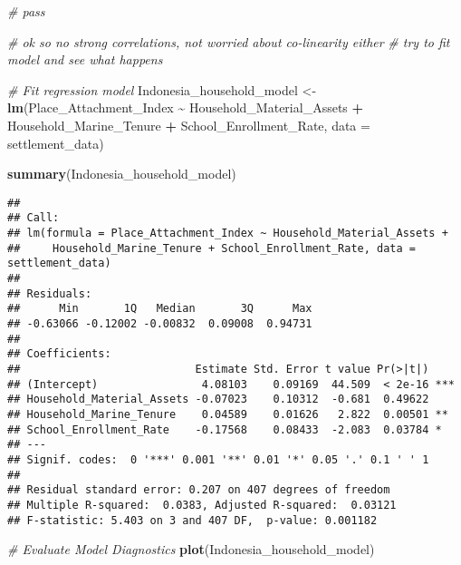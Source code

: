 \documentclass[
]{article}
\newenvironment{Shaded}{\begin{snugshade}}{\end{snugshade}}
\newcommand{\AttributeTok}[1]{\textcolor[rgb]{0.13,0.29,0.53}{#1}}
\newcommand{\CommentTok}[1]{\textcolor[rgb]{0.56,0.35,0.01}{\textit{#1}}}
\newcommand{\FunctionTok}[1]{\textcolor[rgb]{0.13,0.29,0.53}{\textbf{#1}}}
\newcommand{\NormalTok}[1]{#1}
\newcommand{\OtherTok}[1]{\textcolor[rgb]{0.56,0.35,0.01}{#1}}
\newcommand{\SpecialCharTok}[1]{\textcolor[rgb]{0.81,0.36,0.00}{\textbf{#1}}}
\newcommand{\StringTok}[1]{\textcolor[rgb]{0.31,0.60,0.02}{#1}}
\begin{document}
\begin{Shaded}
\begin{Highlighting}[]
\CommentTok{\# pass }

\CommentTok{\# ok so no strong correlations, not worried about co{-}linearity either }
\CommentTok{\# try to fit model and see what happens }

\CommentTok{\# Fit regression model}
\NormalTok{Indonesia\_household\_model }\OtherTok{\textless{}{-}} \FunctionTok{lm}\NormalTok{(Place\_Attachment\_Index }\SpecialCharTok{\textasciitilde{}} \StringTok{\textasciigrave{}}\AttributeTok{Household\_Material\_Assets}\StringTok{\textasciigrave{}} \SpecialCharTok{+}
                                   \StringTok{\textasciigrave{}}\AttributeTok{Household\_Marine\_Tenure}\StringTok{\textasciigrave{}} \SpecialCharTok{+} \StringTok{\textasciigrave{}}\AttributeTok{School\_Enrollment\_Rate}\StringTok{\textasciigrave{}}\NormalTok{, }
                                \AttributeTok{data =}\NormalTok{ settlement\_data)}

\FunctionTok{summary}\NormalTok{(Indonesia\_household\_model)}
\end{Highlighting}
\end{Shaded}

\begin{verbatim}
## 
## Call:
## lm(formula = Place_Attachment_Index ~ Household_Material_Assets + 
##     Household_Marine_Tenure + School_Enrollment_Rate, data = settlement_data)
## 
## Residuals:
##      Min       1Q   Median       3Q      Max 
## -0.63066 -0.12002 -0.00832  0.09008  0.94731 
## 
## Coefficients:
##                           Estimate Std. Error t value Pr(>|t|)    
## (Intercept)                4.08103    0.09169  44.509  < 2e-16 ***
## Household_Material_Assets -0.07023    0.10312  -0.681  0.49622    
## Household_Marine_Tenure    0.04589    0.01626   2.822  0.00501 ** 
## School_Enrollment_Rate    -0.17568    0.08433  -2.083  0.03784 *  
## ---
## Signif. codes:  0 '***' 0.001 '**' 0.01 '*' 0.05 '.' 0.1 ' ' 1
## 
## Residual standard error: 0.207 on 407 degrees of freedom
## Multiple R-squared:  0.0383, Adjusted R-squared:  0.03121 
## F-statistic: 5.403 on 3 and 407 DF,  p-value: 0.001182
\end{verbatim}

\begin{Shaded}
\begin{Highlighting}[]
\CommentTok{\# Evaluate Model Diagnostics}
\FunctionTok{plot}\NormalTok{(Indonesia\_household\_model)}
\end{Highlighting}
\end{Shaded}
\end{document}
